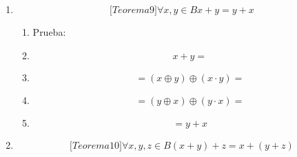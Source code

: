 \begin{enumerate}
\begin{enumerate}
\begin{enumerate}
\begin{enumerate}
        \begin{enumerate}
        \def\labelenumv{\arabic{enumv}.}
        \tightlist
        \item
          Prueba:
        \item
          \[{x + x} =\]
        \item
          \[{= \left( {\left( {x \oplus 0} \right) \oplus \left( {x \cdot 0} \right)} \right)} =\]
        \item
          \[{= {x \oplus 0}} =\]
        \item
          \[= x\]
        \end{enumerate}
      \item
        \[{\lbrack{{Teorema}9}\rbrack}\forall x,{y \in B}{{x + y} = {y + x}}\]

        \begin{enumerate}
        \def\labelenumv{\arabic{enumv}.}
        \tightlist
        \item
          Prueba:
        \item
          \[{x + y} =\]
        \item
          \[{= \left( {x \oplus y} \right)} \oplus {\left( {x \cdot y} \right) =}\]
        \item
          \[{= \left( {y \oplus x} \right)} \oplus {\left( {y \cdot x} \right) =}\]
        \item
          \[= {y + x}\]
        \end{enumerate}
      \item
        \[{\lbrack{{Teorema}10}\rbrack}\forall x,y,{z \in B}{{\left( {x + y} \right) + z} = {x + \left( {y + z} \right)}}\]


\end{enumerate}
\end{enumerate}
\end{enumerate}
\end{enumerate}
